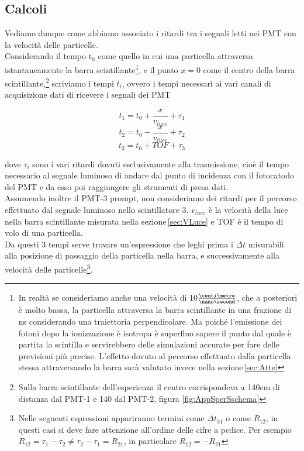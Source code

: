 \documentclass[a4paper,twocolumn]{article}
\begin{document}
\subsection{Calcoli}
\label{sec:CalcoliVMu}
Vediamo dunque come abbiamo associato i ritardi tra i segnali letti nei PMT con la velocità delle particelle.\\
Considerando il tempo t$_0$ come quello in cui una particella attraversa istantaneamente la barra scintillante\footnote{In realtà se consideriamo anche una velocità di 10$\frac{\centi\metre}{\nano\second}$, che a posteriori è molto bassa, la particella attraversa la barra scintillante in una frazione di ns considerando una traiettoria perpendicolare. Ma poiché l'emissione dei fotoni dopo la ionizzazione è isotropa è superfluo sapere il punto dal quale è partita la scintilla e servirebbero delle simulazioni accurate per fare delle previsioni più precise. L'effetto dovuto al percorso effettuato dalla particella stessa attraversando la barra sarà valutato invece nella sezione\,\ref{sec:Atte}}, e il punto $x = 0$ come il centro della barra scintillante,\footnote{Sulla barra scintillante dell'esperienza il centro corrispondeva a 140cm di distanza dal PMT-1 e 140 dal PMT-2, figura \ref{fig:AppSperSschema}} scriviamo i tempi $t_i$, ovvero i tempi necessari ai vari canali di acquisizione dati di ricevere i segnali dei PMT

\begin{equation}
t_1 = t_0 + \frac{x}{v_{luce}} + \tau_1
\end{equation}
\begin{equation}
t_2 = t_0 - \frac{x}{v_{luce}} + \tau_2
\end{equation}
\begin{equation}
t_3 = t_0 + TOF + \tau_3
\label{equ:TempiPMT}
\end{equation}

dove $\tau_i$ sono i vari ritardi dovuti esclusivamente alla trasmissione, cioè il tempo necessario al segnale luminoso di andare dal punto di incidenza con il fotocatodo del PMT e da esso poi raggiungere gli strumenti di presa dati.\\
Assumendo inoltre il PMT-3 prompt, non consideriamo dei ritardi per il percorso effettuato dal segnale luminoso nello scintillatore 3. $v_{luce}$ è la velocità della luce nella barra scintillante misurata nella sezione\,\ref{sec:VLuce} e TOF è il tempo di volo di una particella.\\
Da questi 3 tempi serve trovare un'espressione che leghi prima i $\Delta t$ misurabili alla posizione di passaggio della particella nella barra, e successivamente alla velocità delle particelle\footnote{Nelle seguenti espressioni appariranno termini come $\Delta t_{31}$ o come $R_{12}$, in questi casi si deve fare attenzione all'ordine delle cifre a pedice. Per esempio $R_{12} = \tau_1 - \tau_2 \neq \tau_2 - \tau_1 = R_{21}$, in particolare $R_{12}=-R_{21}$}.
\end{document}
